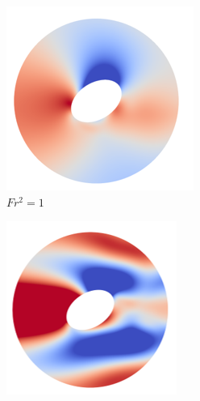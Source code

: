 \begin{figure}
    \begin{subfigure}[b]{0.25\textwidth}
        \centering
        \includegraphics[width=\textwidth]{images/spinning_ellipse/par1p5fs1.png}
        \caption{$Fr^2 = 1$}
        \label{fig:par1p5fs1}
    \end{subfigure}
    \hfill
    \begin{subfigure}[b]{0.25\textwidth}
        \centering
        \includegraphics[width=\textwidth]{images/spinning_ellipse/par1p5fs0p1.png}

\end{subfigure}
\end{figure}
